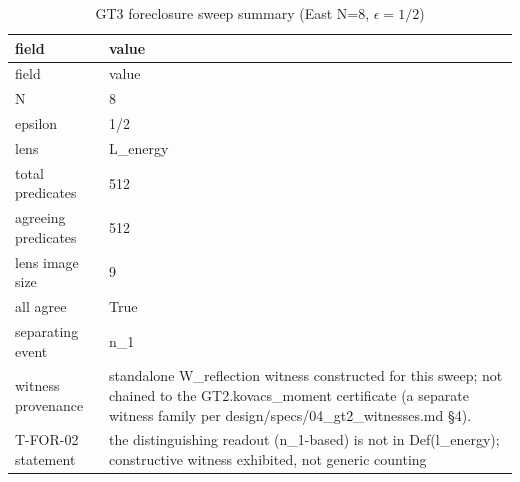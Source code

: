 \begin{longtable}{lp{9cm}}
\caption{GT3 foreclosure sweep summary (East N=8, $\epsilon=1/2$)}\label{tab:gt3-foreclosure} \\
\toprule
field & value \\
\midrule
\endfirsthead
\toprule
field & value \\
\midrule
\endhead
\bottomrule
\endfoot
N & 8 \\
epsilon & 1/2 \\
lens & L\_energy \\
total predicates & 512 \\
agreeing predicates & 512 \\
lens image size & 9 \\
all agree & True \\
separating event & n\_1 \\
witness provenance & standalone W\_reflection witness constructed for this sweep; not chained to the GT2.kovacs\_moment certificate (a separate witness family per design/specs/04\_gt2\_witnesses.md §4). \\
T-FOR-02 statement & the distinguishing readout (n\_1-based) is not in Def(l\_energy); constructive witness exhibited, not generic counting \\
\bottomrule
\end{longtable}

